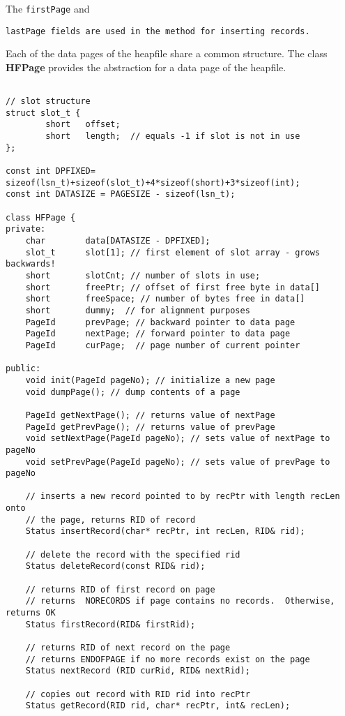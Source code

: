 The {\tt firstPage} and {\tt  lastPage fields are  used in the  method
for inserting records.

Each of the data  pages of the heapfile share  a common structure. The
class {\bf HFPage} provides  the abstraction  for  a data page  of the
heapfile.

\begin{verbatim}

// slot structure
struct slot_t {
        short   offset;  
        short   length;  // equals -1 if slot is not in use
};

const int DPFIXED= sizeof(lsn_t)+sizeof(slot_t)+4*sizeof(short)+3*sizeof(int);
const int DATASIZE = PAGESIZE - sizeof(lsn_t);

class HFPage {
private:
    char        data[DATASIZE - DPFIXED]; 
    slot_t      slot[1]; // first element of slot array - grows backwards!
    short       slotCnt; // number of slots in use;
    short       freePtr; // offset of first free byte in data[]
    short       freeSpace; // number of bytes free in data[]
    short       dummy;  // for alignment purposes
    PageId      prevPage; // backward pointer to data page
    PageId      nextPage; // forward pointer to data page
    PageId      curPage;  // page number of current pointer

public:
    void init(PageId pageNo); // initialize a new page
    void dumpPage(); // dump contents of a page

    PageId getNextPage(); // returns value of nextPage
    PageId getPrevPage(); // returns value of prevPage
    void setNextPage(PageId pageNo); // sets value of nextPage to pageNo
    void setPrevPage(PageId pageNo); // sets value of prevPage to pageNo

    // inserts a new record pointed to by recPtr with length recLen onto
    // the page, returns RID of record 
    Status insertRecord(char* recPtr, int recLen, RID& rid);

    // delete the record with the specified rid
    Status deleteRecord(const RID& rid);

    // returns RID of first record on page
    // returns  NORECORDS if page contains no records.  Otherwise, returns OK
    Status firstRecord(RID& firstRid);

    // returns RID of next record on the page 
    // returns ENDOFPAGE if no more records exist on the page
    Status nextRecord (RID curRid, RID& nextRid);

    // copies out record with RID rid into recPtr
    Status getRecord(RID rid, char* recPtr, int& recLen);


\end{verbatim}}
